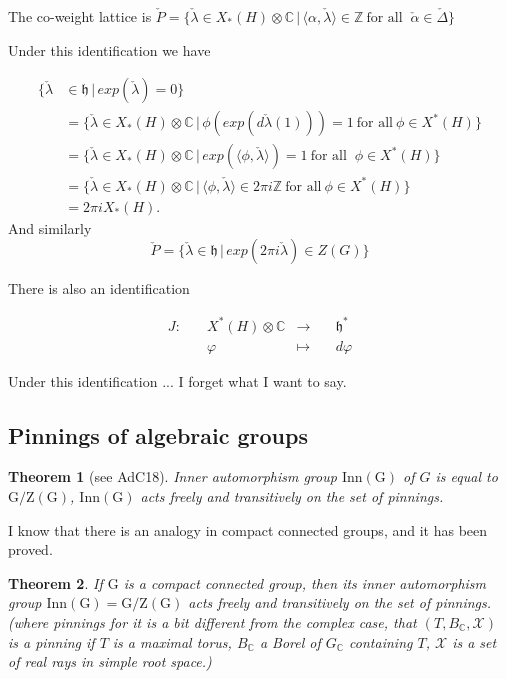 \documentclass[12pt]{amsart}
\numberwithin{equation}{section}
\newtheorem{thm}{Theorem}[section]
\newcommand{\BC}{{\mathbb {C}}}
\newcommand{\BZ}{{\mathbb {Z}}}
\newcommand{\RG}{{\mathrm {G}}}
\newcommand{\fh}{\mathfrak{h}}
\newcommand{\set}[2]{\{#1\,|\,#2\}}
\newcommand{\defmap}[5]{
           \begin{equation*}
              \begin{aligned}
                   #1:\quad  & #2 &\longrightarrow &\quad #3 \\
                      \quad  & #4    &\longmapsto  &\quad #5
              \end{aligned}
           \end{equation*}
          }
\begin{document}
The co-weight lattice is $\check{P} = \set{\check{\lambda} \in X_*(H)\otimes \BC}{\langle\alpha , \check{\lambda} \rangle \in \BZ \ \textrm{for all } \ \check{\alpha} \in \check{\Delta}}$



Under this identification we have

\begin{align*}
  \set{\check{\lambda} & \in \fh}{exp(\check{\lambda})=0}                                                                                                        \\
                       & = \set{\check{\lambda} \in X_*(H)\otimes \BC}{\phi(exp(d \check{\lambda}(1))) = 1 \ \textrm{for all} \ \phi \in X^*(H)}                 \\
                       & = \set{\check{\lambda} \in X_*(H)\otimes \BC}{exp(\langle\phi,\check{\lambda} \rangle) = 1 \ \textrm{for all } \ \phi \in X^*(H)}       \\
                       & = \set{\check{\lambda} \in X_*(H)\otimes \BC}{\langle\phi,\check{\lambda} \rangle \in 2 \pi i \BZ \ \textrm{for all} \ \phi \in X^*(H)} \\
                       & = 2 \pi i X_*(H).
\end{align*}
And similarly
$$\check{P} = \set{\check{\lambda} \in \fh}{exp(2 \pi i \check{\lambda}) \in Z(G)} $$


There is also an identification
\defmap{J}{X^*(H)\otimes \BC}{\fh ^*}{\varphi}{d \varphi}

Under this identification ...  I forget what I want to say.

\subsection{Pinnings of algebraic groups}

\begin{thm}[see AdC18]
  Inner automorphism group $\mathrm{Inn(G)}$ of $G$ is equal to $\mathrm{G/Z(G)}$,
  $\mathrm{Inn(G)}$ acts freely and transitively on the set of pinnings.
\end{thm}


I know that there is an analogy in compact connected groups, and it has been proved.

\begin{thm}
  If $\RG$ is a compact connected group, then its inner automorphism group $\mathrm{Inn(G)} = \mathrm{G/Z(G)}$
  acts freely and transitively on the set of pinnings.
  (where pinnings for it is a bit different from the complex case, that $(T, B_\BC,\mathcal{X})$
  is a pinning if $T$ is a maximal torus, $B_\BC$ a Borel of $G_\BC$ containing $T$, $\mathcal{X}$
  is a set of real rays in simple root space.)
\end{thm}
\end{document}
